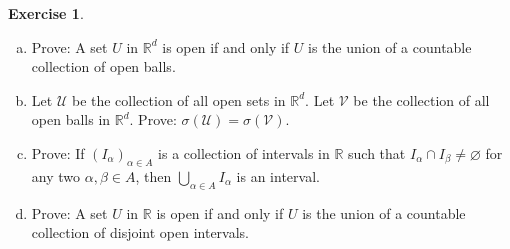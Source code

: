 \documentclass[11pt,oneside]{article}
\numberwithin{equation}{section}
\theoremstyle{definition}
\newtheorem{exercise}{Exercise}
\def\RR{\mathbb{R}}
\def\fancyU{\mathscr{U}}
\def\fancyV{\mathscr{V}}
\begin{document}
\begin{exercise}
  \begin{enumerate}[(a)]
  \item
    Prove: A set $U$ in $\RR ^ d$ is open if and only if $U$ is the union of a countable collection of open balls.
  \item
    Let $\fancyU$ be the collection of all open sets in $\RR^d$. Let
    $\fancyV$ be the collection of all open balls in $\RR ^d$.  Prove:
    $\sigma(\fancyU) = \sigma(\fancyV)$.
  \item
    Prove: If $(I_\alpha)_{\alpha \in A}$ is a collection of intervals
    in $\RR$ such that $I_\alpha \cap I_\beta \neq \varnothing$ for
    any two $\alpha, \beta \in A$,
    then $\bigcup \limits _ { \alpha \in A} I_\alpha$ is an interval.
    
  \item
    Prove: A set $U$ in $\RR$ is open if and only if $U$ is the union
    of a countable collection of disjoint open intervals.  
    
    
  \end{enumerate}
\end{exercise}
\end{document}
